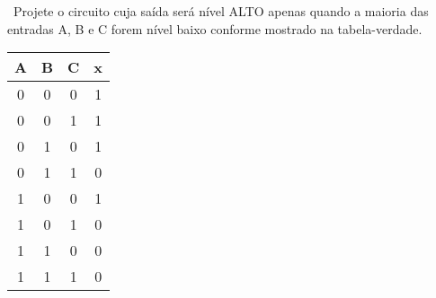 ~Projete o circuito cuja saída será nível ALTO apenas quando a maioria
das entradas A, B e C forem nível baixo conforme mostrado na tabela-verdade.

\begin{center}
\begin{tabular}[ht]{cccc}\hline
  A & B & C & x \\\hline
  0 & 0 & 0 & 1 \\
  0 & 0 & 1 & 1 \\
  0 & 1 & 0 & 1 \\
  0 & 1 & 1 & 0 \\
  1 & 0 & 0 & 1 \\
  1 & 0 & 1 & 0 \\
  1 & 1 & 0 & 0 \\
  1 & 1 & 1 & 0 \\\hline
\end{tabular}
\end{center}

